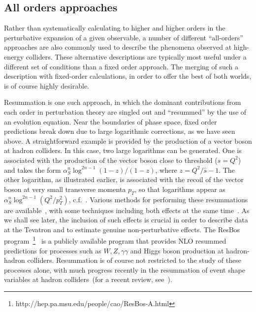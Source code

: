 \documentclass[12pt]{iopart}
\def\as{\alpha_S}
\begin{document}
\subsection{All orders approaches}
\label{sec:allorders}

Rather than systematically calculating to higher and higher orders in the perturbative
expansion of a given observable, a number of different ``all-orders'' approaches are
also commonly used to describe the phenomena observed at high-energy colliders. These
alternative descriptions are typically most useful under a different set of conditions
than a fixed order approach. The merging of such a description with fixed-order
calculations, in order to offer the best of both worlds, is of course highly desirable.

Resummation is one such approach, in which the dominant contributions from each order in perturbation theory are
singled out and ``resummed'' by the use of an evolution equation. Near the boundaries of phase space, fixed order
predictions break down due to large logarithmic corrections, as we have seen above. A straightforward example is
provided by the production of a vector boson at hadron colliders. In this case, two large logarithms can be
generated. One is associated with the production of the vector boson close to threshold (${\hat s}=Q^2$) and takes
the form $\as^n \log^{2n-1}(1-z)/(1-z)$, where $z=Q^2/{\hat s}-1$. The other logarithm, as illustrated
earlier, is associated with the recoil of the vector boson at very small transverse momenta $p_T$, so that
logarithms appear as $\as^n \log^{2n-1}(Q^2/p_T^2)$, c.f.~. Various methods for
performing these resummations are available~\cite{Sterman:1986aj, Catani:1989ne, Catani:1990rp,
 Parisi:1979se, Altarelli:1984pt, Collins:1981uk, Collins:1981va, Collins:1984kg}, with some techniques
 including both effects at the
same time~\cite{Sterman:2004yk,Kulesza:2003wn,Kulesza:2002vk}. As we shall see later, the inclusion of such
effects is crucial in order to describe data at
the Tevatron and to estimate genuine non-perturbative effects. The ResBos program~\footnote{
http://hep.pa.msu.edu/people/cao/ResBos-A.html}~\cite{Balazs:1997xd}
is a publicly available program that provides NLO resummed predictions for processes such as
$W,Z,\gamma\gamma$ and Higgs boson production at hadron-hadron colliders. 
 Resummation is of course not restricted to the study
of these processes alone, with much progress recently in the resummation of event shape variables at hadron
colliders~(for a recent review, see~\cite{Banfi:2005mt}). 
\end{document}
